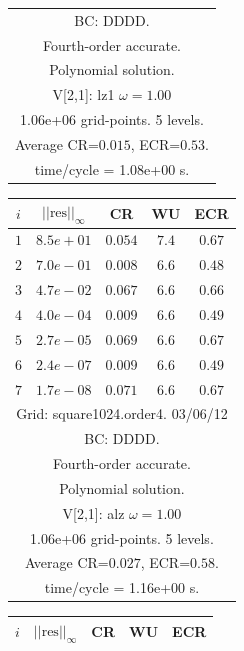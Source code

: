 \begin{table}[hbt]
\begin{center}
{\begin{tabular}{|c|c|c|c|c|}
\multicolumn{5}{|c|}{BC: DDDD.}  \\
\multicolumn{5}{|c|}{Fourth-order accurate.}  \\
\multicolumn{5}{|c|}{Polynomial solution.}  \\
\multicolumn{5}{|c|}{V[2,1]: lz1 $\omega=1.00$}  \\
\multicolumn{5}{|c|}{1.06e+06 grid-points. 5 levels.}  \\
\multicolumn{5}{|c|}{Average CR=$0.015$, ECR=$0.53$.}  \\
\multicolumn{5}{|c|}{time/cycle = 1.08e+00 s.}  \\
\hline 
\end{tabular}
\begin{tabular}{|c|c|c|c|c|} \hline 
 $i$   & $\vert\vert\mbox{res}\vert\vert_\infty$  &  CR     &  WU    & ECR  \\   \hline 
 $ 1$  & $ 8.5e+01$ & $0.054$ & $ 7.4$ & $0.67$ \\ 
 $ 2$  & $ 7.0e-01$ & $0.008$ & $ 6.6$ & $0.48$ \\ 
 $ 3$  & $ 4.7e-02$ & $0.067$ & $ 6.6$ & $0.66$ \\ 
 $ 4$  & $ 4.0e-04$ & $0.009$ & $ 6.6$ & $0.49$ \\ 
 $ 5$  & $ 2.7e-05$ & $0.069$ & $ 6.6$ & $0.67$ \\ 
 $ 6$  & $ 2.4e-07$ & $0.009$ & $ 6.6$ & $0.49$ \\ 
 $ 7$  & $ 1.7e-08$ & $0.071$ & $ 6.6$ & $0.67$ \\ 
\hline 
\multicolumn{5}{|c|}{Grid: square1024.order4. 03/06/12}  \\
\multicolumn{5}{|c|}{BC: DDDD.}  \\
\multicolumn{5}{|c|}{Fourth-order accurate.}  \\
\multicolumn{5}{|c|}{Polynomial solution.}  \\
\multicolumn{5}{|c|}{V[2,1]: alz $\omega=1.00$}  \\
\multicolumn{5}{|c|}{1.06e+06 grid-points. 5 levels.}  \\
\multicolumn{5}{|c|}{Average CR=$0.027$, ECR=$0.58$.}  \\
\multicolumn{5}{|c|}{time/cycle = 1.16e+00 s.}  \\
\hline 
\end{tabular}
\begin{tabular}{|c|c|c|c|c|} \hline 
 $i$   & $\vert\vert\mbox{res}\vert\vert_\infty$  &  CR     &  WU    & ECR  \\   \hline 

\end{tabular}}
\end{center}
\end{table}
